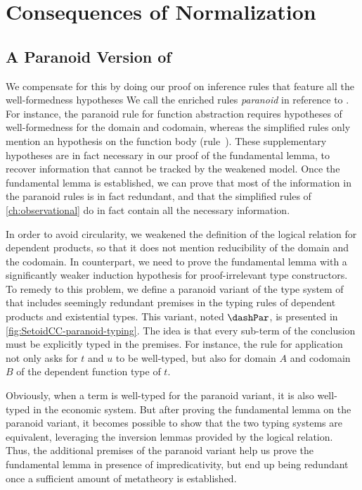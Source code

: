 \section{Consequences of Normalization}
\label{sec:normalization-consequences}

\subsection{A Paranoid Version of \SetoidCC }

We compensate for this by doing our proof on inference rules that feature 
all the well-formedness hypotheses 
% 
We call the enriched rules \emph{paranoid} in reference to .
% 
For instance, the paranoid rule for function abstraction requires hypotheses
of well-formedness for the domain and codomain, whereas the simplified rules
only mention an hypothesis on the function body (rule~).
% 
These supplementary hypotheses are in fact necessary in our proof of the 
fundamental lemma, to recover information that cannot be tracked by the 
weakened model.
% 
Once the fundamental lemma is established, we can prove that most of the 
information in the paranoid rules is in fact redundant, and that the 
simplified rules of \cref{ch:observational} do in fact contain all the 
necessary information.

In order to avoid circularity, we weakened the definition of the
logical relation for dependent products, so that it does not mention
reducibility of the domain and the codomain.
%
In counterpart, we need to prove the fundamental lemma with a
significantly weaker induction hypothesis for proof-irrelevant type
constructors.
%
To remedy to this problem, we define a paranoid variant of the type
system of \SetoidCC that includes seemingly redundant premises in the
typing rules of dependent products and existential types.
%
This variant, noted $\dashPar$, is presented in \cref{fig:SetoidCC-paranoid-typing}. The idea is that every
sub-term of the conclusion must be explicitly typed
in the premises.
%
For instance, the rule for application not only asks for $t$ and $u$ to
be well-typed, but also for domain $A$ and codomain $B$ of the dependent
function type of $t$.

Obviously, when a term is well-typed for the paranoid variant, it is
also well-typed in the economic system. But after proving the
fundamental lemma on the paranoid variant, it becomes possible to show
that the two typing systems are equivalent, leveraging the inversion
lemmas provided by the logical relation.
%
Thus, the additional premises of the paranoid variant help us
prove the fundamental lemma in presence of impredicativity, but end up
being redundant once a sufficient amount of metatheory is established.

